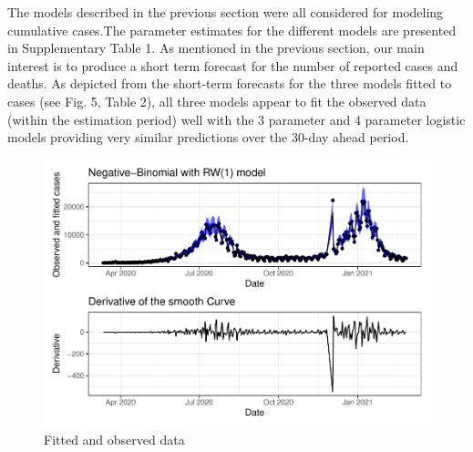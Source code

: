 \documentclass[10pt,letterpaper]{article}
\begin{document}
The models described in the previous section were all considered for
modeling cumulative cases.The parameter estimates for the different
models are presented in Supplementary Table 1. As mentioned in the
previous section, our main interest is to produce a short term forecast
for the number of reported cases and deaths. As depicted from the
short-term forecasts for the three models fitted to cases (see Fig. 5,
Table 2), all three models appear to fit the observed data (within the
estimation period) well with the 3 parameter and 4 parameter logistic
models providing very similar predictions over the 30-day ahead period.

\begin{figure}
\includegraphics[width=0.99\linewidth]{COVIDincidenceSA_files/figure-latex/unnamed-chunk-9-1} \caption{Fitted and observed data}\label{fig:unnamed-chunk-9}
\end{figure}
\end{document}
